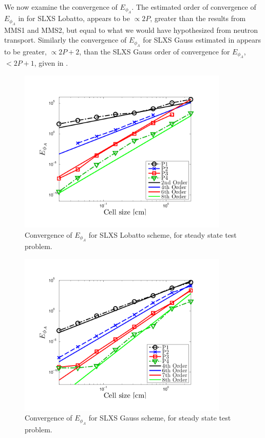 We now examine the convergence of $E_{\phi_A}$.  
The estimated order of convergence of $E_{\phi_A}$ in  for SLXS Lobatto, appears to be $\propto 2P$, greater than the results from MMS1 and MMS2, but equal to what we would have hypothesized from neutron transport.  
Similarly the convergence of $E_{\phi_A}$ for SLXS Gauss estimated in  appears to be greater, $\propto 2P+2$, than the SLXS Gauss order of convergence for $E_{\phi_A}$, $<2P+1$, given in .
\begin{figure}[!hbp]
\centering
\includegraphics[width=10cm,trim=0.25in  0.2in 0.75in 0.5in,clip=true]{chapter6_grey_radtran/Dissertation_Data/Constant_Time_SLXS_Lobatto_phi_A.pdf}
\caption{Convergence of $E_{\phi_A}$ for SLXS Lobatto scheme, for steady state test problem.}
\label{fig:constant_time_lobatto_phi_a}
\end{figure}
%
%
\begin{figure}[!htp]
\centering
\includegraphics[width=10cm,trim=0.25in  0.2in 0.75in 0.5in,clip=true]{chapter6_grey_radtran/Dissertation_Data/Constant_Time_SLXS_Gauss_phi_A.pdf}
\caption{Convergence of $E_{\phi_A}$ for SLXS Gauss scheme, for steady state test problem.}
\label{fig:constant_time_gauss_phi_a}
\end{figure}

